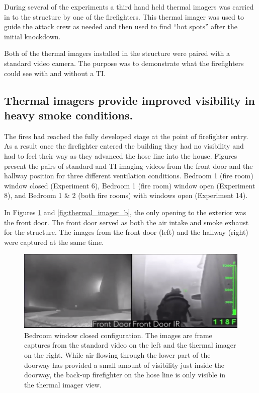 \documentclass[12pt,oneside]{book}
\begin{document}
During several of the experiments a third hand held thermal imagers was carried in to the structure by one of the firefighters.  This thermal imager was used to guide the attack crew as needed and then used to find “hot spots” after the initial knockdown.  

Both of the thermal imagers installed in the structure were paired with a standard video camera.  The purpose was to demonstrate what the firefighters could see with and without a TI.  

\subsection{Thermal imagers provide improved visibility in heavy smoke conditions.}

The fires had reached the fully developed stage at the point of firefighter entry.  As a result once the firefighter entered the building they had no visibility and had to feel their way as they advanced the hose line into the house.   Figures present the pairs of standard and TI imaging videos from the front door and the hallway position for three different ventilation conditions.  Bedroom 1 (fire room) window closed (Experiment 6), Bedroom 1 (fire room) window open (Experiment 8), and Bedroom 1 \& 2 (both fire rooms) with windows open (Experiment 14).  

In Figures \ref{fig:thermal_imager_a} and \ref{fig:thermal_imager_b}, the only opening to the exterior was the front door.  The front door served as both the air intake and smoke exhaust for the structure.  The images from the front door (left) and the hallway (right) were captured at the same time.    

\begin{figure}[H]
\centering
\includegraphics[width=1.0\textwidth]{../0_Images/Tactical_Considerations/Thermal_Imager/Exp6FDpair.PNG}
\caption[Thermal Imager A]{Bedroom window closed configuration. The images are frame captures from the standard video on the left and the thermal imager on the right. While air flowing through the lower part of the doorway has provided a small amount of visibility just inside the doorway, the back-up firefighter on the hose line is only visible in the thermal imager view.}
\label{fig:thermal_imager_a}
\end{figure}
\end{document}
